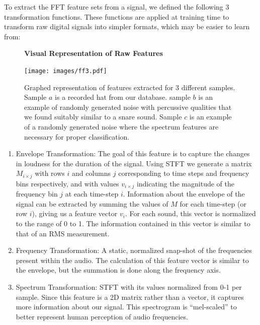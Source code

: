 \documentclass[\main/thesis.tex]{subfiles}
\begin{document}
To extract the FFT feature sets from a signal, we defined the following 3 transformation functions. These functions are applied at training time to transform raw digital signals into simpler formats, which may be easier to learn from: 
\begin{figure}
\centering
\textbf{Visual Representation of Raw Features}\par\medskip
    { \texttt{[image: images/ff3.pdf]}}
\caption{Graphed representation of features extracted for 3 different samples. Sample $a$ is a recorded hat from our database. sample $b$ is an example of randomly generated noise with percussive qualities that we found suitably similar to a snare sound. Sample $c$ is an example of a randomly generated noise where the spectrum features are necessary for proper classification.}
\label{fig:stackspectrums}
\end{figure}
\begin{enumerate}
\item Envelope Transformation: The goal of this feature is to capture the changes in loudness for the duration of the signal. Using STFT we generate a matrix $M_{i \times j}$ with rows $i$ and columns $j$ corresponding to time steps and frequency bins respectively, and with values $v_{i \times j}$ indicating the magnitude of the frequency bin $j$ at each time-step $i$. Information about the envelope of the signal can be extracted by summing the values of $M$ for each time-step (or row $i$), giving us a feature vector $v_i$. For each sound, this vector is normalized to the range of 0 to 1. The information contained in this vector is similar to that of an RMS measurement.
\item Frequency Transformation: A static, normalized snap-shot of the  frequencies present within the audio. The calculation of this feature vector is similar to the envelope, but the summation is done along the frequency axis.
\item Spectrum Transformation: STFT with its values normalized from 0-1 per sample. Since this feature is a 2D matrix rather than a vector, it captures more information about our signal. This spectrogram is \enquote{mel-scaled}\cite{stevens1940relation} to better represent human perception of audio frequencies.
\end{enumerate}
\end{document}
